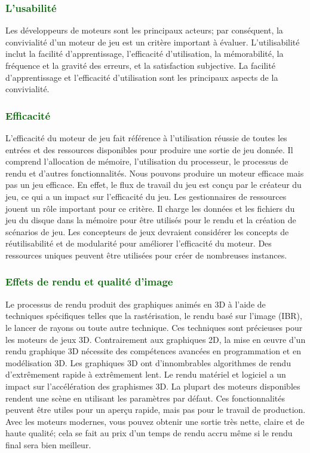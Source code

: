 \documentclass[ebook, 8pt, oneside, openany]{memoir}
\begin{document}
	\subsubsection{\textcolor{darkgreen}{L'usabilité}}
	Les développeurs de moteurs sont les principaux acteurs; par conséquent, la convivialité d'un moteur de
	jeu est un critère important à évaluer. L'utilisabilité inclut la facilité d'apprentissage, l'efficacité
	d'utilisation, la mémorabilité, la fréquence et la gravité des erreurs, et la satisfaction subjective.
	La facilité d'apprentissage et l'efficacité d'utilisation sont les principaux aspects de la
	convivialité.
	\subsubsection{\textcolor{darkgreen}{Efficacité}}
	L'efficacité du moteur de jeu fait référence à l'utilisation réussie de toutes les entrées et des
	ressources disponibles pour produire une sortie de jeu donnée. Il comprend l'allocation de mémoire,
	l'utilisation du processeur, le processus de rendu et d'autres fonctionnalités. Nous pouvons produire un
	moteur efficace mais pas un jeu efficace. En effet, le flux de travail du jeu est conçu par le créateur
	du jeu, ce qui a un impact sur l'efficacité du jeu. Les gestionnaires de ressources jouent un rôle
	important pour ce critère. Il charge les données et les fichiers du jeu du disque dans la mémoire pour
	être utilisés pour le rendu et la création de scénarios de jeu. Les concepteurs de jeux devraient
	considérer les concepts de réutilisabilité et de modularité pour améliorer l'efficacité du moteur. Des
	ressources uniques peuvent être utilisées pour créer de nombreuses instances.
	\subsubsection{\textcolor{darkgreen}{Effets de rendu et qualité d'image}}
	Le processus de rendu produit des graphiques animés en 3D à l'aide de techniques spécifiques telles que
	la rastérisation, le rendu basé sur l'image (IBR), le lancer de rayons ou toute autre technique. Ces
	techniques sont précieuses pour les moteurs de jeux 3D. Contrairement aux graphiques 2D, la mise en
	œuvre d'un rendu graphique 3D nécessite des compétences avancées en programmation et en modélisation 3D.
	Les graphiques 3D ont d'innombrables algorithmes de rendu d'extrêmement rapide à extrêmement lent. Le
	rendu matériel et logiciel a un impact sur l'accélération des graphismes 3D. La plupart des moteurs
	disponibles rendent une scène en utilisant les paramètres par défaut. Ces fonctionnalités peuvent être
	utiles pour un aperçu rapide, mais pas pour le travail de production. Avec les moteurs modernes, vous
	pouvez obtenir une sortie très nette, claire et de haute qualité; cela se fait au prix d'un temps de
	rendu accru même si le rendu final sera bien meilleur.
\end{document}
